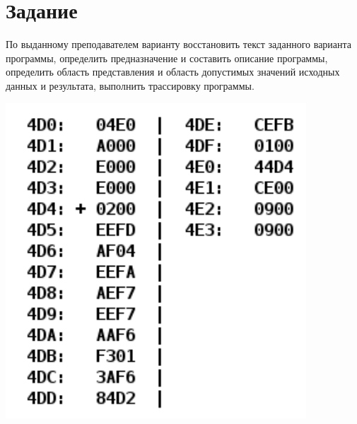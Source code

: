 \documentclass{article}
\begin{document}
\itmo[
  variant=31158,
  labn=2,
  discipline=Основы профессиональной деятельности,
  group=P3115,
  student=Владимир Мацюк,
  teacher=Пашнин Александр Денисович,
  logo=../../../lib/img/itmo.png
]

\section{Задание}
По выданному преподавателем варианту восстановить текст заданного варианта программы, определить предназначение и составить описание программы, определить область представления и область допустимых значений исходных данных и результата, выполнить трассировку программы.
\begin{center}
  \includegraphics[scale=0.8]{task.png}
\end{center}
\end{document}
